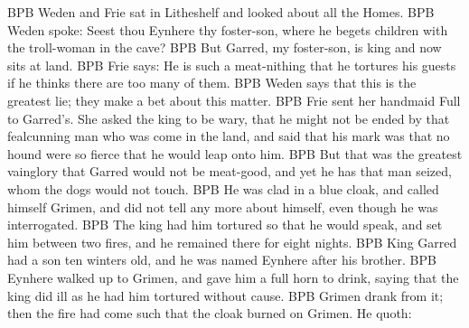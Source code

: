 BPB Weden and Frie sat in Litheshelf and looked about all the Homes.
BPB Weden spoke: Seest thou Eynhere thy foster-son, where he begets children with the troll-woman in the cave?
BPB But Garred, my foster-son, is king and now sits at land.
BPB Frie says: He is such a meat-nithing that he tortures his guests if he thinks there are too many of them.
BPB Weden says that this is the greatest lie; they make a bet about this matter.
BPB Frie sent her handmaid Full to Garred's. She asked the king to be wary, that he might not be ended by that fealcunning man who was come in the land, and said that his mark was that no hound were so fierce that he would leap onto him.
BPB But that was the greatest vainglory that Garred would not be meat-good, and yet he has that man seized, whom the dogs would not touch.
BPB He was clad in a blue cloak, and called himself Grimen, and did not tell any more about himself, even though he was interrogated.
BPB The king had him tortured so that he would speak, and set him between two fires, and he remained there for eight nights.
BPB King Garred had a son ten winters old, and he was named Eynhere after his brother.
BPB Eynhere walked up to Grimen, and gave him a full horn to drink, saying that the king did ill as he had him tortured without cause.
BPB Grimen drank from it; then the fire had come such that the cloak burned on Grimen. He quoth:
